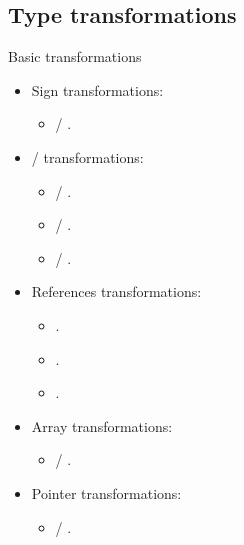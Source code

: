 \subsection{Type transformations}

\begin{frame}[t,fragile]{Basic transformations}
\begin{itemize}
  \item Sign transformations:
    \begin{itemize}
      \item {} / .
    \end{itemize}
  \item {}/ transformations:
    \begin{itemize}
      \item {} / .
      \item {} / .
      \item {} / .
    \end{itemize}
  \item References transformations:
    \begin{itemize}
      \item {}.
      \item {}.
      \item {}.
    \end{itemize}
  \item Array transformations:
    \begin{itemize}
      \item {} / .
    \end{itemize}
  \item Pointer transformations:
    \begin{itemize}
      \item {} / .
    \end{itemize}
\end{itemize}
\end{frame}

